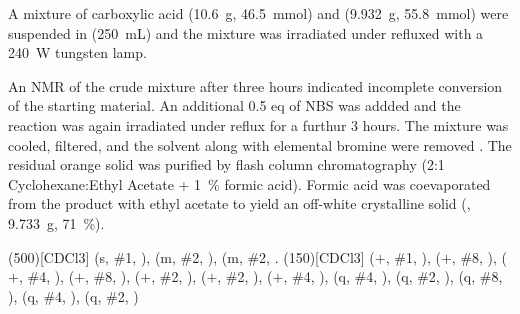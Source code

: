 \begin{experimental}[delta=(ppm),pos-number=sub,use-equal]

A mixture of carboxylic acid  (\SI{10.6}{\gram}, \SI{46.5}{\milli\mol}) and  (\SI{9.932}{\gram}, \SI{55.8}{\milli\mol}) were suspended in  (\SI{250}{\milli\L}) and the mixture was irradiated under refluxed with a \SI{240}{\watt} tungsten lamp.

An NMR of the crude mixture after three hours indicated incomplete conversion of the starting material. An additional 0.5 eq of NBS was addded and the reaction was again irradiated under reflux for a furthur 3 hours. The mixture was cooled, filtered, and the solvent along with elemental bromine were removed \invacuo. The residual orange solid was purified by flash column chromatography (2:1 Cyclohexane:Ethyl Acetate + \SI{1}{\percent} formic acid). Formic acid was coevaporated from the product with ethyl acetate to yield an off-white crystalline solid (, \SI{9.733}{\gram}, \SI{71}{\percent}).

\NMR(500)[CDCl3]  (s, \#{1}, ),  (m, \#{2}, ),  (m, \#{2}, .
%
(150)[CDCl3]  ($+$, \#{1}, ),  ($+$,
\#{8}, ),  ($+$, \#{4}, ),  ($+$, \#{8},
),  ($+$, \#{2}, ),  ($+$, \#{2},
),  ($+$, \#{4}, ),  (q, \#{4},
),  (q, \#{2}, ),  (q, \#{8}, ),
 (q, \#{4}, ),  (q, \#{2}, )
%
\end{experimental}

